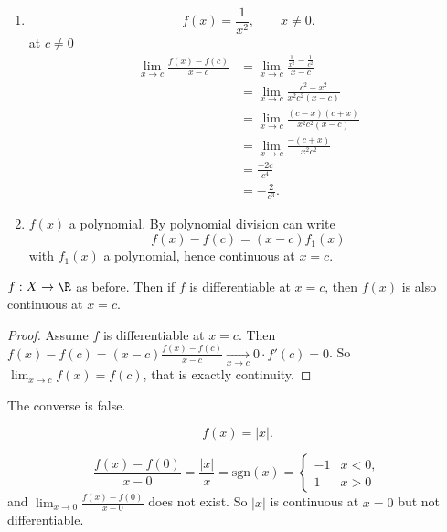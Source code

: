 \documentclass[10pt, a4paper]{article}
\begin{document}
\begin{example}
    \begin{enumerate}[label = (\roman*)]
        \item 
        \[
        f(x) = \frac{1}{x ^ 2},\qquad x \neq 0.
        \]
        at $c \neq 0$
        \begin{align*}
            \lim_{x \to c}\frac{f(x) - f(c)}{x - c} &= \lim_{x \to c}\frac{\frac{1}{x ^ 2} - \frac{1}{c ^ 2}}{x - c} \\
            &= \lim_{x \to c}\frac{c ^ 2 - x ^ 2}{x ^ 2c ^ 2(x - c)} \\
            &= \lim_{x \to c}\frac{(c - x)(c + x)}{x ^ 2c ^ 2(x - c)} \\
            &= \lim_{x \to c}\frac{-(c + x)}{x ^ 2c ^ 2} \\
            &= \frac{-2c}{c ^ 4} \\
            &= -\frac{2}{c ^ 3}.
        \end{align*}

        \item $f(x)$ a polynomial.
        By polynomial division can write
        \[
        f(x) - f(c) = (x - c)f_1(x)
        \]
        with $f_1(x)$ a polynomial,
        hence continuous at $x = c$.
    \end{enumerate}
\end{example}

\begin{proposition}
    $f : X \to \R$ as before.
    Then if $f$ is differentiable at $x = c$,
    then $f(x)$ is also continuous at $x = c$.

    \begin{proof}
        Assume $f$ is differentiable at $x = c$.
        Then $f(x) - f(c) = (x - c) \frac{f(x) - f(c)}{x - c} \xrightarrow[x \to c]{} 0 \cdot f'(c) = 0$.
        So $\lim_{x \to c}f(x) = f(c)$,
        that is exactly continuity.
    \end{proof}
\end{proposition}
The converse is false.
\begin{example}
    \[
    f(x) = |x|.
    \]

    \begin{solution}
        \[
        \frac{f(x) - f(0)}{x - 0} = \frac{|x|}{x} = \mathrm{sgn}(x) = \begin{cases}
            -1 & x < 0, \\
            1 & x > 0
        \end{cases}
        \]
        and $\lim_{x \to 0}\frac{f(x) - f(0)}{x - 0}$ does not exist.
        So $|x|$ is continuous at $x = 0$ but not differentiable.
    \end{solution}
\end{example}
\end{document}
